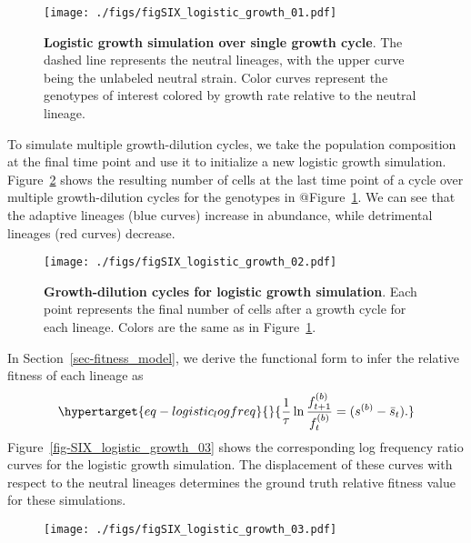 \documentclass[
]{scrartcl}
\begin{document}
\begin{refsegment}
\begin{figure}
{\centering \texttt{[image: ./figs/figSIX\_logistic\_growth\_01.pdf]}

}

\caption{\label{fig-SIX_logistic_growth_01}\textbf{Logistic growth
simulation over single growth cycle}. The dashed line represents the
neutral lineages, with the upper curve being the unlabeled neutral
strain. Color curves represent the genotypes of interest colored by
growth rate relative to the neutral lineage.}

\end{figure}

To simulate multiple growth-dilution cycles, we take the population
composition at the final time point and use it to initialize a new
logistic growth simulation. Figure~\ref{fig-SIX_logistic_growth_02}
shows the resulting number of cells at the last time point of a cycle
over multiple growth-dilution cycles for the genotypes in
@Figure~\ref{fig-SIX_logistic_growth_01}. We can see that the adaptive
lineages (blue curves) increase in abundance, while detrimental lineages
(red curves) decrease.

\begin{figure}

{\centering \texttt{[image: ./figs/figSIX\_logistic\_growth\_02.pdf]}

}

\caption{\label{fig-SIX_logistic_growth_02}\textbf{Growth-dilution
cycles for logistic growth simulation}. Each point represents the final
number of cells after a growth cycle for each lineage. Colors are the
same as in Figure~\ref{fig-SIX_logistic_growth_01}.}

\end{figure}

In Section~\ref{sec-fitness_model}, we derive the functional form to
infer the relative fitness of each lineage as
\begin{equation}\protect\hypertarget{eq-logistic_logfreq}{}{
\frac{1}{\tau}\ln \frac{f_{t+1}^{(b)}}{f_{t}^{(b)}} = (s^{(b)} - \bar{s}_t).
}\label{eq-logistic_logfreq}\end{equation}
Figure~\ref{fig-SIX_logistic_growth_03} shows the corresponding log
frequency ratio curves for the logistic growth simulation. The
displacement of these curves with respect to the neutral lineages
determines the ground truth relative fitness value for these
simulations.

\begin{figure}

{\centering \texttt{[image: ./figs/figSIX\_logistic\_growth\_03.pdf]}

}
\end{figure}
\end{refsegment}
\end{document}
